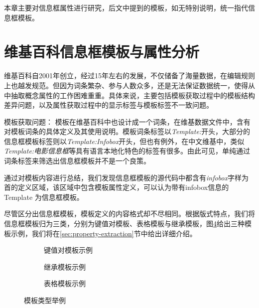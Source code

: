 本章主要对信息框属性进行研究，后文中提到的{\heiti 模板}，如无特别说明，统一指代{\heiti 信息框模板}。

\section{维基百科信息框模板与属性分析}
\label{sec:template-analysis}

维基百科自2001年创立，经过15年左右的发展，不仅储备了海量数据，在编辑规则上也越发规范。但因为词条繁杂、参与人数众多，还是无法保证数据统一，使得从中抽取概念属性的工作困难重重。具体来说，主要包括模板获取过程中的模板结构差异问题，以及属性获取过程中的显示标签与模板标签不一致问题。

{\heiti 模板获取问题：}
模板在维基百科中也设计成一个词条，在维基数据文件中，含有对模板词条的具体定义及其使用说明。模板词条标签以\textit{Template:}开头，大部分的信息框模板标签则以\textit{Template:Infobox}开头，但也有例外，在中文维基中，类似\textit{Template:电影信息框}等具有语言本地化特色的标签有很多。由此可见，单纯通过词条标签来筛选出信息框模板并不是一个良策。

通过对模板内容进行总结，我们发现信息框模板的源代码中都含有\textit{infobox}字样为首的定义区域，该区域中包含模板属性定义，可以认为带有infobox信息的Template 为信息框模板。

尽管区分出信息框模板，模板定义的内容格式却不尽相同。根据版式特点，我们将信息框模板归为三类，分别为键值对模板、表格模板与继承模板，图\ref{fig:template-examples}给出三种模板示例，我们将在\ref{sec:property-extraction}节中给出详细介绍。

\begin{figure}[ht]
\centering
    \begin{subfigure}{7.2cm}
        \centering
        \caption{键值对模板示例}
        \label{fig:template-keyvalue}
    \end{subfigure}
    \hspace{0.02cm}
    \begin{subfigure}{7.2cm}
        \centering
        \caption{继承模板示例}
        \label{fig:template-inherit}
    \end{subfigure}
    \vspace{0.08cm}
    \begin{subfigure}{9.6cm}
        \centering
        \caption{表格模板示例}
        \label{fig:template-table}
    \end{subfigure}
\caption{模板类型举例}
\label{fig:template-examples}
\end{figure}

